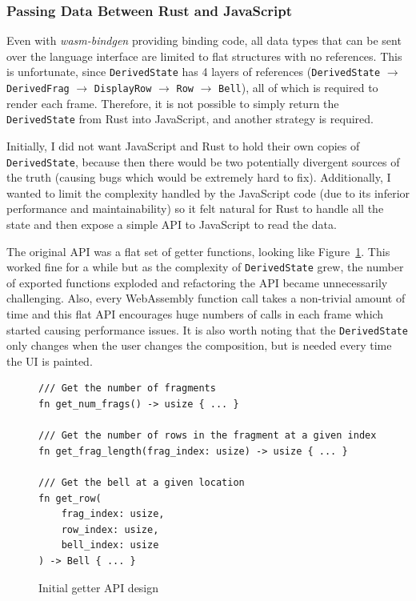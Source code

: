 \documentclass[12pt]{article}
\begin{document}
\subsubsection{Passing Data Between Rust and JavaScript}

Even with \emph{wasm-bindgen} providing binding code, all data types that can be sent over the
language interface are limited to flat structures with no references.  This is unfortunate, since
\verb|DerivedState| has 4 layers of references (\verb|DerivedState| $\to$ \verb|DerivedFrag| $\to$
\verb|DisplayRow| $\to$ \verb|Row| $\to$ \verb|Bell|), all of which is required to render each
frame.  Therefore, it is not possible to simply return the \verb|DerivedState| from Rust into
JavaScript, and another strategy is required.

Initially, I did not want JavaScript and Rust to hold their own copies of \verb|DerivedState|,
because then there would be two potentially divergent sources of the truth (causing bugs which would
be extremely hard to fix).  Additionally, I wanted to limit the complexity handled by the JavaScript
code (due to its inferior performance and maintainability) so it felt natural for Rust to handle all
the state and then expose a simple API to JavaScript to read the data.

The original API was a flat set of getter functions, looking like Figure~\ref{fig:initial-api}.
This worked fine for a while but as the complexity of \verb|DerivedState| grew, the number of
exported functions exploded and refactoring the API became unnecessarily challenging.  Also, every
WebAssembly function call takes a non-trivial amount of time and this flat API encourages huge
numbers of calls in each frame which started causing performance issues.  It is also worth noting
that the \verb|DerivedState| only changes when the user changes the composition, but is needed every
time the UI is painted.

\begin{figure}
    \begin{verbatim}
/// Get the number of fragments
fn get_num_frags() -> usize { ... }

/// Get the number of rows in the fragment at a given index
fn get_frag_length(frag_index: usize) -> usize { ... }

/// Get the bell at a given location
fn get_row(
    frag_index: usize,
    row_index: usize,
    bell_index: usize
) -> Bell { ... }
    \end{verbatim}
    \caption{Initial getter API design}\label{fig:initial-api}
\end{figure}
\end{document}
